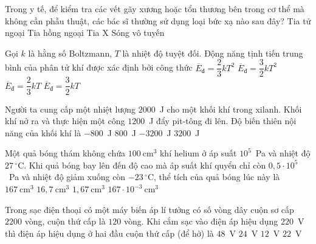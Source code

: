 	\begin{ex}%
		Trong y tế, để kiểm tra các vết gãy xương hoặc tổn thương bên trong cơ thể mà không cần phẫu thuật, các bác sĩ thường sử dụng loại bức xạ nào sau đây?
		\choice
		{Tia tử ngoại}
		{Tia hồng ngoại}
		{\True Tia X}
		{Sóng vô tuyến}
	\end{ex}

	\begin{ex}%
		Gọi $k$ là hằng số Boltzmann, $T$ là nhiệt độ tuyệt đối. Động năng tịnh tiến trung bình của phân tử khí được xác định bởi công thức
		\choice
		{$\overline{E}_{\text{đ}}=\dfrac{2}{3}kT^2$}
		{$\overline{E}_{\text{đ}}=\dfrac{3}{2}kT^2$}
		{$\overline{E}_{\text{đ}}=\dfrac{2}{3}kT$}
		{\True $\overline{E}_{\text{đ}}=\dfrac{3}{2}kT$}
	\end{ex}

	\begin{ex}%
		Người ta cung cấp một nhiệt lượng $2000$~J cho một khối khí trong xilanh. Khối khí nở ra và thực hiện một công $1200$~J đẩy pit-tông đi lên. Độ biến thiên nội năng của khối khí là
		\choice
		{$-800$~J}
		{\True $800$~J}
		{$-3200$~J}
		{$3200$~J}
	\end{ex}

	\begin{ex}%
		Một quả bóng thám không chứa $100~\text{cm}^3$ khí helium ở áp suất $10^5$~Pa và nhiệt độ $27\,^\circ\text{C}$. Khi quả bóng bay lên đến độ cao mà áp suất khí quyển chỉ còn $0{,}5\cdot 10^5$~Pa và nhiệt độ giảm xuống còn $-23\,^\circ\text{C}$, thể tích của quả bóng lúc này là
		\choice
		{\True $167~\text{cm}^3$}
		{$16{,}7~\text{cm}^3$}
		{$1{,}67~\text{cm}^3$}
		{$167\cdot 10^{-3}~\text{cm}^3$}
	\end{ex}

	\begin{ex}%
		Trong sạc điện thoại có một máy biến áp lí tưởng có số vòng dây cuộn sơ cấp $2200$ vòng, cuộn thứ cấp là $120$ vòng. Khi cắm sạc vào điện áp hiệu dụng $220$~V thì điện áp hiệu dụng ở hai đầu cuộn thứ cấp (để hở) là
		\choice
		{$48$~V}
		{$24$~V}
		{\True $12$~V}
		{$22$~V}
	\end{ex}

